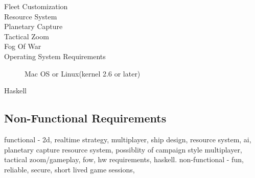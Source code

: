 \begin{description}
\item[Fleet Customization]



\item[Resource System]

\item[Planetary Capture]

\item[Tactical Zoom]

\item[Fog Of War]

\item[Operating System Requirements]
Mac OS or Linux(kernel 2.6 or later) 

\item[Haskell]

\end{description}


\subsection{Non-Functional Requirements}




functional - 2d, realtime strategy, multiplayer, ship design, resource system, ai, planetary capture resource system, possiblity of campaign style multiplayer, tactical zoom/gameplay, fow, hw requirements, haskell.
non-functional - fun, reliable, secure, short lived game sessions, 
